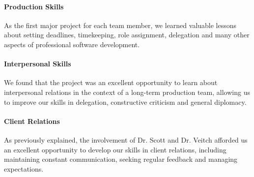 \paragraph{Production Skills}
As the first major project for each team member, we learned valuable lessons about setting
deadlines, timekeeping, role assignment, delegation and many other aspects of professional
software development.

\paragraph{Interpersonal Skills}
We found that the project was an excellent opportunity to learn about interpersonal relations 
in the context of a long-term production team, allowing us to improve our skills in delegation,
constructive criticism and general diplomacy. 

\paragraph{Client Relations}
As previously explained, the involvement of Dr. Scott and Dr. Veitch afforded us an excellent
opportunity to develop our skills in client relations, including maintaining constant 
communication, seeking regular feedback and managing expectations.  
